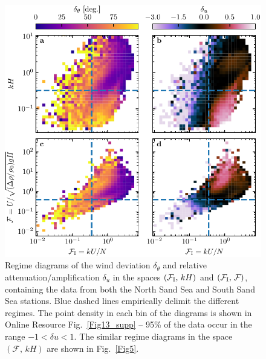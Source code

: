 \begin{figure}[p]
\centering
\includegraphics[scale=1]{Figures/Figure14_supp.pdf}
\caption{Regime diagrams of the wind deviation $\delta_{\theta}$ and relative attenuation/amplification $\delta_{u}$ in the spaces $(\mathcal{F}_{\textup{I}}, \, kH)$ and $(\mathcal{F}_{\textup{I}}, \, \mathcal{F})$, containing the data from both the North Sand Sea and South Sand Sea stations. Blue dashed lines empirically delimit the different regimes. The point density in each bin of the diagrams is shown in Online Resource Fig.~\ref{Fig13_supp} -- 95\% of the data occur in the range $-1 < \delta u < 1$. The similar regime diagrams in the space $(\mathcal{F}, \, kH)$ are shown in Fig.~\ref{Fig5}.}
\label{Fig14_supp}
\end{figure}

